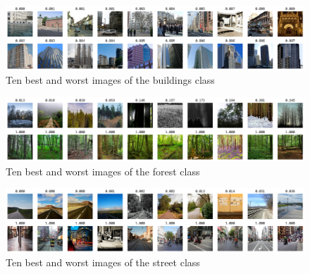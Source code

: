 \documentclass{article}[9pt]
\begin{document}
\clearpage

\begin{figure}[h]
    \centering
    \includegraphics[width=1.0\textwidth]{best_worst_first_class.png}
    \caption{Ten best and worst images of the buildings class}
    \label{fig:featuremaps}
\end{figure}


\begin{figure}[h]
    \centering
    \includegraphics[width=1.0\textwidth]{best_worst_second_class.png}
    \caption{Ten best and worst images of the forest class}
    \label{fig:featuremaps}
\end{figure}


\begin{figure}[h]
    \centering
    \includegraphics[width=1.0\textwidth]{best_worst_sixth_class.png}
    \caption{Ten best and worst images of the street class}
    \label{fig:featuremaps}
\end{figure}
\end{document}
